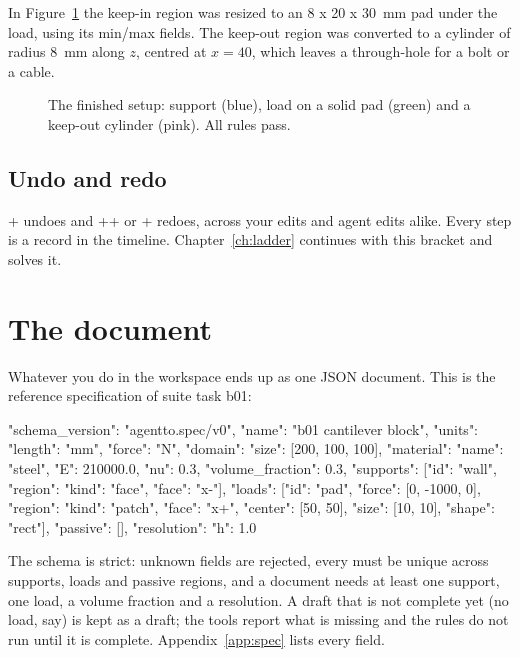 In Figure~\ref{fig:keep} the keep-in region was resized to an 8 x 20 x 30~mm pad under the load, using its min/max
fields. The keep-out region was converted to a cylinder of radius 8~mm along $z$, centred at $x = 40$, which leaves a
through-hole for a bolt or a cable.

\begin{figure}[t]
\caption{The finished setup: support (blue), load on a solid pad (green) and a keep-out cylinder (pink). All rules
pass.}
\label{fig:keep}
\end{figure}

\subsection{Undo and redo}
+ undoes and ++ or + redoes, across
your edits and agent edits alike. Every step is a record in the timeline. Chapter~\ref{ch:ladder} continues with this
bracket and solves it.

\section{The document}\label{sec:document}
Whatever you do in the workspace ends up as one JSON document. This is the reference specification of suite task b01:

\begin{jsoncode}
{
  "schema_version": "agentto.spec/v0",
  "name": "b01 cantilever block",
  "units": {"length": "mm", "force": "N"},
  "domain": {"size": [200, 100, 100]},
  "material": {"name": "steel", "E": 210000.0, "nu": 0.3},
  "volume_fraction": 0.3,
  "supports": [{"id": "wall", "region": {"kind": "face", "face": "x-"}}],
  "loads": [{"id": "pad", "force": [0, -1000, 0],
             "region": {"kind": "patch", "face": "x+", "center": [50, 50],
                        "size": [10, 10], "shape": "rect"}}],
  "passive": [],
  "resolution": {"h": 1.0}
}
\end{jsoncode}

The schema is strict: unknown fields are rejected, every  must be unique across supports, loads and passive
regions, and a document needs at least one support, one load, a volume fraction and a resolution. A draft that is not
complete yet (no load, say) is kept as a draft; the tools report what is missing and the rules do not run until it is
complete. Appendix~\ref{app:spec} lists every field.

